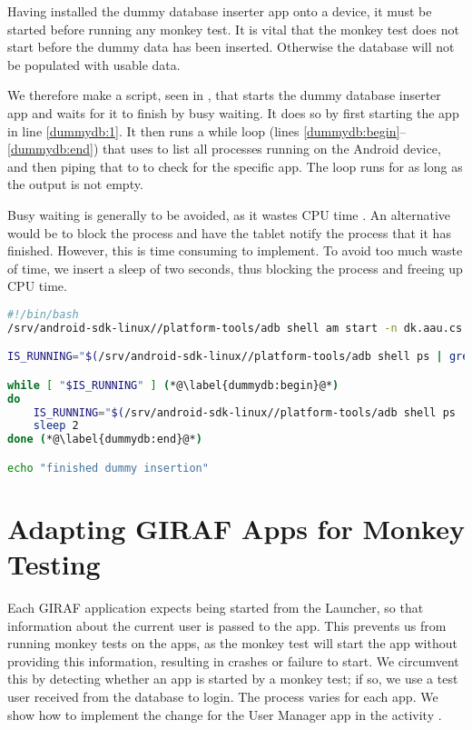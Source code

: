 Having installed the dummy database inserter app onto a device, it must be started before running any monkey test. It is vital that the monkey test does not start before the dummy data has been inserted. Otherwise the database will not be populated with usable data.

We therefore make a script, seen in , that starts the dummy database inserter app and waits for it to finish by busy waiting. It does so by first starting the app in line \ref{dummydb:1}. It then runs a while loop (lines \ref{dummydb:begin}--\ref{dummydb:end}) that uses  to list all processes running on the Android device, and then piping that to  to check for the specific app. The loop runs for as long as the output is not empty.

Busy waiting is generally to be avoided, as it wastes CPU time \parencite[ch.2]{tanenbaum2007}. An alternative would be to block the process and have the tablet notify the process that it has finished. However, this is time consuming to implement. To avoid too much waste of time, we insert a sleep of two seconds, thus blocking the process and freeing up CPU time.

\begin{lstlisting}[float=tbp,language=bash,showstringspaces=false,caption=Bash script which starts and waits for dummy database inserter,label=lst:start_wait_dummy_db_inserter]
#!/bin/bash
/srv/android-sdk-linux//platform-tools/adb shell am start -n dk.aau.cs.giraf.dummydbinserter/dk.aau.cs.giraf.dummydbinserter.MainActivity (*@\label{dummydb:1}@*)

IS_RUNNING="$(/srv/android-sdk-linux//platform-tools/adb shell ps | grep dk.aau.cs.giraf.dummydbinserter)"

while [ "$IS_RUNNING" ] (*@\label{dummydb:begin}@*)
do
    IS_RUNNING="$(/srv/android-sdk-linux//platform-tools/adb shell ps | grep dk.aau.cs.giraf.dummydbinserter)"
    sleep 2
done (*@\label{dummydb:end}@*)

echo "finished dummy insertion"
\end{lstlisting}

\section{Adapting GIRAF Apps for Monkey Testing}\label{sec:adapting_apps_for_monkey_testing}
Each GIRAF application expects being started from the Launcher, so that information about the current user is passed to the app. This prevents us from running monkey tests on the apps, as the monkey test will start the app without providing this information, resulting in crashes or failure to start. We circumvent this by detecting whether an app is started by a monkey test; if so, we use a test user received from the database to login. The process varies for each app. We show how to implement the change for the User Manager app in the activity .


